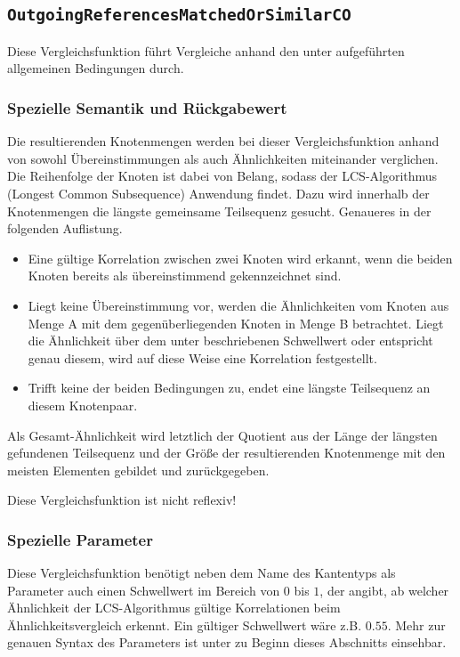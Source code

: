 \vskip20pt
%
%
\subsection{\texttt{OutgoingReferencesMatchedOrSimilarCO}}
Diese Vergleichsfunktion führt Vergleiche anhand den unter\mylinebreak{} aufgeführten allgemeinen Bedingungen durch.

\subsubsection*{Spezielle Semantik und Rückgabewert}
Die resultierenden Knotenmengen werden bei dieser Vergleichsfunktion anhand von sowohl Übereinstimmungen als auch Ähnlichkeiten miteinander verglichen. Die Reihenfolge der Knoten ist dabei von Belang, sodass der LCS-Algorithmus (Longest Common Subsequence) Anwendung findet. Dazu wird innerhalb der Knotenmengen die längste gemeinsame Teilsequenz gesucht. Genaueres in der folgenden Auflistung.
\begin{itemize}
	\item Eine gültige Korrelation zwischen zwei Knoten wird erkannt, wenn die beiden Knoten bereits als übereinstimmend gekennzeichnet sind.
	\item Liegt keine Übereinstimmung vor, werden die Ähnlichkeiten vom Knoten aus Menge A mit dem gegenüberliegenden Knoten in Menge B betrachtet. Liegt die Ähnlichkeit über dem unter  beschriebenen Schwellwert oder entspricht genau diesem, wird auf diese Weise eine Korrelation festgestellt.
	\item Trifft keine der beiden Bedingungen zu, endet eine längste Teilsequenz an diesem Knotenpaar.
\end{itemize}

Als Gesamt-Ähnlichkeit wird letztlich der Quotient aus der Länge der längsten gefundenen Teilsequenz und der Größe der resultierenden Knotenmenge mit den meisten Elementen gebildet und zurückgegeben.

 Diese Vergleichsfunktion ist nicht reflexiv!

\subsubsection*{Spezielle Parameter}
Diese Vergleichsfunktion benötigt neben dem Name des Kantentyps als Parameter auch einen Schwellwert im Bereich von $0$ bis $1$, der angibt, ab welcher Ähnlichkeit der LCS-Algorithmus gültige Korrelationen beim Ähnlichkeitsvergleich erkennt. Ein gültiger Schwellwert wäre z.B. $0.55$. Mehr zur genauen Syntax des Parameters ist unter  zu Beginn dieses Abschnitts einsehbar.


